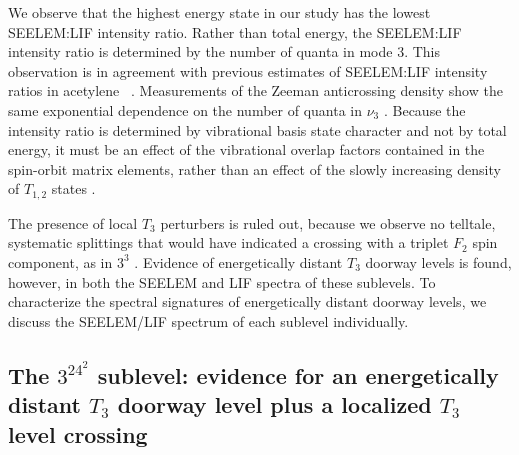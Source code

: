 We observe that the highest energy state in our study has the lowest
SEELEM:LIF intensity ratio.  Rather than total energy, the SEELEM:LIF
intensity ratio is determined by the number of quanta in mode 3.  This
observation is in agreement with previous estimates of SEELEM:LIF
intensity ratios in acetylene \astate\ \cite{humphrey97}.
Measurements of the Zeeman anticrossing density show the same
exponential dependence on the number of quanta in $\nu_3$
\cite{dupre91}.  Because the intensity ratio is determined by
vibrational basis state character and not by total energy, it must be
an effect of the vibrational overlap factors contained in the
spin-orbit matrix elements, rather than an effect of the slowly
increasing density of $T_{1,2}$ states \cite{dupre91, dupre95b}.

The presence of local $T_3$ perturbers is ruled out, because we
observe no telltale, systematic splittings that would have indicated a
crossing with a triplet $F_2$ spin component, as in $3^3$ 
\cite{mishra04}.  Evidence of energetically distant $T_3$ doorway
levels is found, however, in both the SEELEM and LIF spectra of these
sublevels.  To characterize the spectral signatures of energetically
distant doorway levels, we discuss the SEELEM/LIF spectrum of each
sublevel individually.


\subsection{The $3^24^2$  sublevel: evidence for an
  energetically distant $T_3$ doorway level plus a localized $T_3$
  level crossing}




